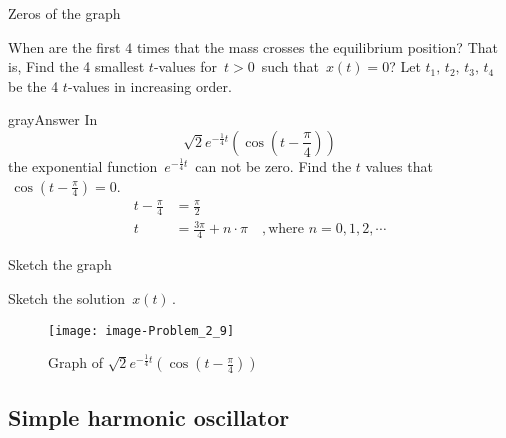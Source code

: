 \begin{problem}
  Zeros of the graph
\end{problem}
When are the first $4$ times that the mass crosses the equilibrium position?
That is, Find the 4 smallest $t$-values for $\, t>0\,$ such that $\, x(t)=0$?
Let $t_1,\, t_2,\, t_3,\, t_4\,$ be the 4 $t$-values in increasing order.
\begin{mybox}{gray}{Answer}
  In
  \begin{equation*}
    \sqrt{2} e^{-\frac{1}{4} t} \left( \cos (t - \frac{\pi}{4}) \right) 
  \end{equation*}
  the exponential function $\displaystyle \, e^{-\frac{1}{4} t} \,$
  can not be zero. Find the $t$ values that $\, \cos (t - \frac{\pi}{4}) = 0$.
  \begin{align*}
    t - \frac{\pi}{4} &= \frac{\pi}{2} \\
    t &= \frac{3 \pi}{4} + n \cdot \pi \quad , 
    \text{where } n = 0, 1, 2, \cdots 
  \end{align*}
\end{mybox}

\begin{problem}
  Sketch the graph  
\end{problem}
Sketch the solution $\, x(t)\,$.

\begin{figure}[ht!]
  \centering
  \texttt{[image: image-Problem\_2\_9]}    
  \caption{ Graph of $\displaystyle \sqrt{2}
    e^{-\frac{1}{4} t} \left( \cos (t - \frac{\pi}{4}) \right)$ }
\end{figure}
\clearpage

\subsection{Simple harmonic oscillator}





